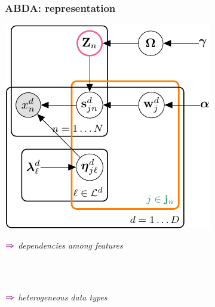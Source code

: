 \documentclass[xcolor={usenames,dvipsnames,svgnames}, compress, aspectratio=169, 11pt]{beamer}
\newcommand{\comment}[3][\small]{\begin{minipage}{1\linewidth}
          \raggedleft
          {
            $\color{violet}\boldsymbol\Rightarrow$
            #1
            {\emph{#2}}
          }
      \end{minipage}#3\\
}
\begin{document}
\begin{frame}[t, htt=bgrey2]
  \frametitle{ABDA: representation}

  \large
  \begin{minipage}[t]{0.3\linewidth}
    \vspace{15pt}
    \includegraphics[width=.99\linewidth]{figures/joint-param-hspn-crop}
  \end{minipage}\hfill\begin{minipage}[t]{0.6\linewidth}
    \vspace{40pt}
    \hspace{-100pt}\comment[\normalsize]{dependencies among features}{}\\
    \hspace{-110pt}\comment[\normalsize]{heterogeneous data types}{}
  
  \end{minipage}  
\end{frame}
\end{document}

